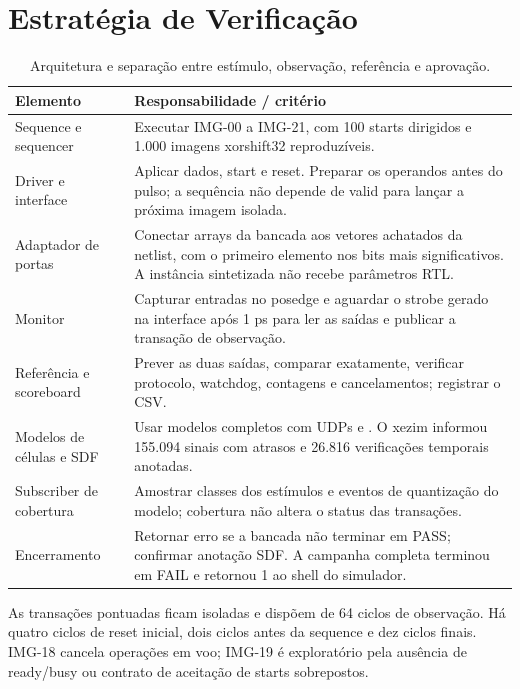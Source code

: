 \documentclass[12pt,a4paper]{article}
\newcommand{\arquivo}[1]{\texttt{\detokenize{#1}}}
\begin{document}
\section{Estratégia de Verificação}
\begin{table}[H]\centering\small
\begin{tabularx}{\textwidth}{p{5.3cm}X}\toprule
\textbf{Elemento} & \textbf{Responsabilidade / critério}\\\midrule
Sequence e sequencer & Executar IMG-00 a IMG-21, com 100 starts dirigidos e 1.000 imagens xorshift32 reproduzíveis.\\
Driver e interface & Aplicar dados, start e reset. Preparar os operandos antes do pulso; a sequência não depende de valid para lançar a próxima imagem isolada.\\
Adaptador de portas & Conectar arrays da bancada aos vetores achatados da netlist, com o primeiro elemento nos bits mais significativos. A instância sintetizada \arquivo{tb_cnn.dut} não recebe parâmetros RTL.\\
Monitor & Capturar entradas no posedge e aguardar o strobe gerado na interface após 1 ps para ler as saídas e publicar a transação de observação.\\
Referência e scoreboard & Prever as duas saídas, comparar exatamente, verificar protocolo, watchdog, contagens e cancelamentos; registrar o CSV.\\
Modelos de células e SDF & Usar modelos completos com UDPs e \arquivo{specify}. O xezim informou 155.094 sinais com atrasos e 26.816 verificações temporais anotadas.\\
Subscriber de cobertura & Amostrar classes dos estímulos e eventos de quantização do modelo; cobertura não altera o status das transações.\\
Encerramento & Retornar erro se a bancada não terminar em PASS; confirmar anotação SDF. A campanha completa terminou em FAIL e retornou 1 ao shell do simulador.\\\bottomrule
\end{tabularx}
\caption{Arquitetura e separação entre estímulo, observação, referência e aprovação.}
\end{table}

As transações pontuadas ficam isoladas e dispõem de 64 ciclos de observação. Há quatro ciclos de reset inicial, dois ciclos antes da sequence e dez ciclos finais. IMG-18 cancela operações em voo; IMG-19 é exploratório pela ausência de ready/busy ou contrato de aceitação de starts sobrepostos.
\end{document}
